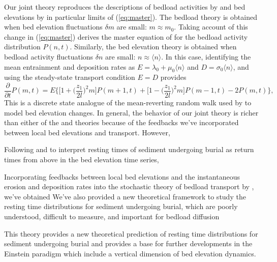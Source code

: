 \documentclass[draft]{agujournal2018}
\newcommand\be{\begin{equation}} %
\newcommand\ee{\end{equation}}   %
\newcommand\bra{\langle}
\newcommand\ket{\rangle}
\begin{document}
Our joint theory reproduces the descriptions of bedload activities by \citet{Ancey2008} and bed elevations by \citet{Martin2014} in particular limits of (\ref{eq:master}).
The \citet{Ancey2008} bedload theory is obtained when bed elevation fluctuations $\delta m$ are small: $m \approx m_0$.
Taking account of this change in (\ref{eq:master}) derives the master equation of \citet{Ancey2008} for the bedload activity distribution $P(n,t)$.
Similarly, the \citet{Martin2014} bed elevation theory is obtained when bedload activity fluctuations $\delta n$ are small: $n \approx \bra n \ket$.
In this case, identifying the mean entrainment and deposition rates as $E =\lambda_0 + \mu_0 \bra n \ket$ and $D = \sigma_0 \bra n \ket$, and using the steady-state transport condition $E=D$ \citep[e.g.][]{Einstein1950} provides
\be \frac{\partial}{\partial t}P(m,t) =  E \Big\{ \Big[1 +\Big(\frac{z_1}{2 l}\Big)^2m\Big]P(m+1,t) +  \Big[1 -\Big(\frac{z_1}{2 l}\Big)^2m\Big]P(m-1,t) - 2P(m,t)\Big\}, \label{eq:ou}\ee
This is a discrete state analogue of the mean-reverting random walk used by \citet{Martin2014} to model bed elevation changes.
In general, the behavior of our joint theory is richer than either of the \citet{Ancey2008} and \citet{Martin2014} theories because of the feedbacks we've incorporated between local bed elevations and transport.
However, 




Following \citet{Voepel2013} and \citet{Martin2014} to interpret resting times of sediment undergoing burial as return times from above in the bed elevation time series, 


Incorporating feedbacks between local bed elevations and the instantaneous erosion and deposition rates \citep[e.g.][]{Wong2007} into the stochastic theory of bedload transport by \citet{Ancey2008}, we've obtained 
We've also provided a new theoretical framework to study the resting time distributions for sediment undergoing burial, which are poorly understood, difficult to measure, and important for bedload diffusion 







This theory provides a new theoretical prediction of resting time distributions for sediment undergoing burial and provides a base for further developments in the Einstein paradigm which include a vertical dimension of bed elevation dynamics.
\end{document}
